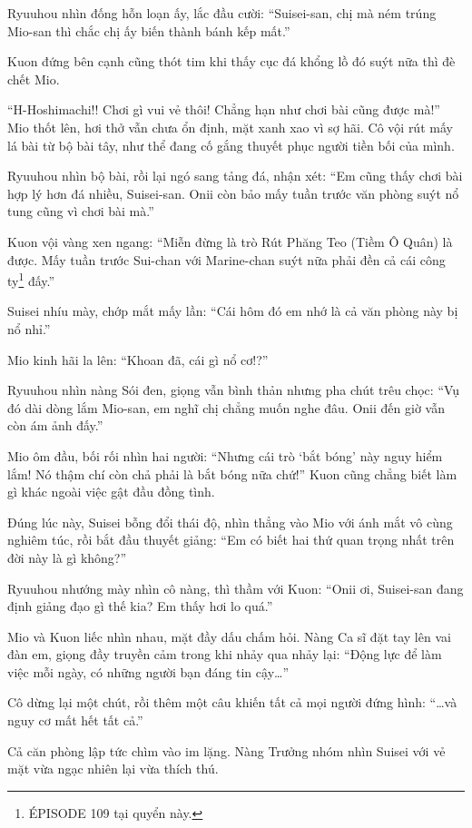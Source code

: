 \documentclass[../main.tex]{subfiles}
\begin{document}
Ryuuhou nhìn đống hỗn loạn ấy, lắc đầu cười: ``Suisei-san, chị mà ném trúng Mio-san thì chắc chị ấy biến thành bánh kếp mất.''

Kuon đứng bên cạnh cũng thót tim khi thấy cục đá khổng lồ đó suýt nữa thì đè chết Mio.

``H-Hoshimachi!! Chơi gì vui vẻ thôi! Chẳng hạn như chơi bài cũng được mà!'' Mio thốt lên, hơi thở vẫn chưa ổn định, mặt xanh xao vì sợ hãi. Cô vội rút mấy lá bài từ bộ bài tây, như thể đang cố gắng thuyết phục người tiền bối của mình.

Ryuuhou nhìn bộ bài, rồi lại ngó sang tảng đá, nhận xét: ``Em cũng thấy chơi bài hợp lý hơn đá nhiều, Suisei-san. Onii còn bảo mấy tuần trước văn phòng suýt nổ tung cũng vì chơi bài mà.''

Kuon vội vàng xen ngang: ``Miễn đừng là trò Rút Phăng Teo (Tiềm Ô Quân) là được. Mấy tuần trước Sui-chan với Marine-chan suýt nữa phải đền cả cái công ty\footnote{{\flaregothic ÉPISODE 109} tại quyển này.} đấy.''

Suisei nhíu mày, chớp mắt mấy lần: ``Cái hôm đó em nhớ là cả văn phòng này bị nổ nhỉ.''

Mio kinh hãi la lên: ``Khoan đã, cái gì nổ cơ!?''

Ryuuhou nhìn nàng Sói đen, giọng vẫn bình thản nhưng pha chút trêu chọc: ``Vụ đó dài dòng lắm Mio-san, em nghĩ chị chẳng muốn nghe đâu. Onii đến giờ vẫn còn ám ảnh đấy.''

Mio ôm đầu, bối rối nhìn hai người: ``Nhưng cái trò `bắt bóng' này nguy hiểm lắm! Nó thậm chí còn chả phải là bắt bóng nữa chứ!'' Kuon cũng chẳng biết làm gì khác ngoài việc gật đầu đồng tình.

Đúng lúc này, Suisei bỗng đổi thái độ, nhìn thẳng vào Mio với ánh mắt vô cùng nghiêm túc, rồi bắt đầu thuyết giảng: ``Em có biết hai thứ quan trọng nhất trên đời này là gì không?''

Ryuuhou nhướng mày nhìn cô nàng, thì thầm với Kuon: ``Onii ơi, Suisei-san đang định giảng đạo gì thế kia? Em thấy hơi lo quá.''

Mio và Kuon liếc nhìn nhau, mặt đầy dấu chấm hỏi. Nàng Ca sĩ đặt tay lên vai đàn em, giọng đầy truyền cảm trong khi nhảy qua nhảy lại: ``Động lực để làm việc mỗi ngày, có những người bạn đáng tin cậy\dots''

Cô dừng lại một chút, rồi thêm một câu khiến tất cả mọi người đứng hình: ``\dots và nguy cơ mất hết tất cả.''

Cả căn phòng lập tức chìm vào im lặng. Nàng Trưởng nhóm nhìn Suisei với vẻ mặt vừa ngạc nhiên lại vừa thích thú.
\end{document}
